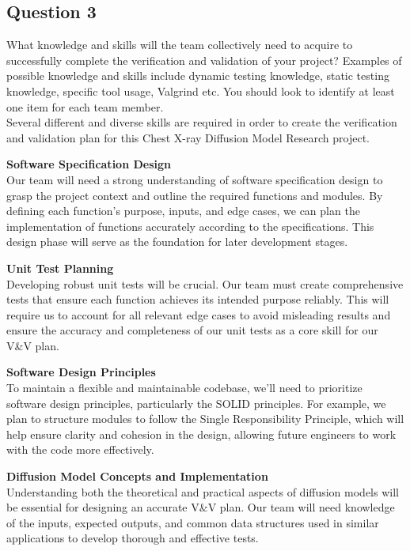 \documentclass[12pt, titlepage]{article}
\begin{document}
\subsection{Question 3}
What knowledge and skills will the team collectively need to acquire to
successfully complete the verification and validation of your project?
Examples of possible knowledge and skills include dynamic testing knowledge,
static testing knowledge, specific tool usage, Valgrind etc.  You should look to
identify at least one item for each team member.\\

Several different and diverse skills are required in order to create the verification and validation plan for this Chest X-ray Diffusion Model Research project.

\textbf{Software Specification Design}\\
Our team will need a strong understanding of software specification design to grasp the project context and outline the required functions and modules. By defining each function's purpose, inputs, and edge cases, we can plan the implementation of functions accurately according to the specifications. This design phase will serve as the foundation for later development stages.

\textbf{Unit Test Planning}\\
Developing robust unit tests will be crucial. Our team must create comprehensive tests that ensure each function achieves its intended purpose reliably. This will require us to account for all relevant edge cases to avoid misleading results and ensure the accuracy and completeness of our unit tests as a core skill for our V\&V plan.

\textbf{Software Design Principles}\\
To maintain a flexible and maintainable codebase, we'll need to prioritize software design principles, particularly the SOLID principles. For example, we plan to structure modules to follow the Single Responsibility Principle, which will help ensure clarity and cohesion in the design, allowing future engineers to work with the code more effectively.

\textbf{Diffusion Model Concepts and Implementation}\\
Understanding both the theoretical and practical aspects of diffusion models will be essential for designing an accurate V\&V plan. Our team will need knowledge of the inputs, expected outputs, and common data structures used in similar applications to develop thorough and effective tests.
\end{document}
